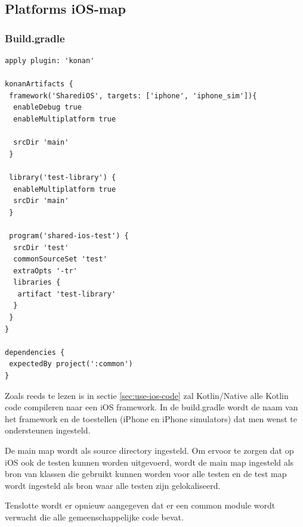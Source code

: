 \subsection{Platforms iOS-map}
\subsubsection{Build.gradle}
\label{sec:ios-build-gradle}
\begin{lstlisting}
apply plugin: 'konan'

konanArtifacts {
 framework('SharediOS', targets: ['iphone', 'iphone_sim']){
  enableDebug true
  enableMultiplatform true

  srcDir 'main'
 }

 library('test-library') {
  enableMultiplatform true
  srcDir 'main'
 }

 program('shared-ios-test') {
  srcDir 'test'
  commonSourceSet 'test'
  extraOpts '-tr'
  libraries {
   artifact 'test-library'
  }
 }
}

dependencies {
 expectedBy project(':common')
}
\end{lstlisting}

Zoals reeds te lezen is in sectie \ref{sec:use-ios-code} zal Kotlin/Native alle Kotlin code compileren naar een iOS framework. In de build.gradle wordt de naam van het framework en de toestellen (iPhone en iPhone simulators) dat men wenst te ondersteunen ingesteld.

De main map wordt als source directory ingesteld. Om ervoor te zorgen dat op iOS ook de testen kunnen worden uitgevoerd, wordt de main map ingesteld als bron van klassen die gebruikt kunnen worden voor alle testen en de test map wordt ingesteld als bron waar alle testen zijn gelokaliseerd.

Tenslotte wordt er opnieuw aangegeven dat er een common module wordt verwacht die alle gemeenschappelijke code bevat.

